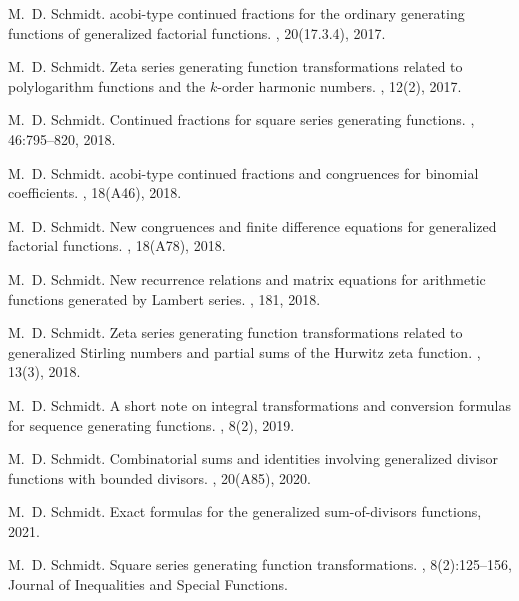 \documentclass[12pt,reqno,a4letter]{article}
\numberwithin{figure}{section}
\numberwithin{table}{section}
\numberwithin{equation}{section}
\theoremstyle{plain}
\numberwithin{theorem}{section}
\theoremstyle{definition}
\begin{document}
\begin{thebibliography}{10}
M.~D. Schmidt.
acobi-type continued fractions for the ordinary generating
  functions of generalized factorial functions.
, 20(17.3.4), 2017.

M.~D. Schmidt.
\newblock Zeta series generating function transformations related to
  polylogarithm functions and the $k$-order harmonic numbers.
, 12(2), 2017.

M.~D. Schmidt.
\newblock Continued fractions for square series generating functions.
, 46:795--820, 2018.

M.~D. Schmidt.
acobi-type continued fractions and congruences for binomial
  coefficients.
, 18(A46), 2018.

M.~D. Schmidt.
\newblock New congruences and finite difference equations for generalized
  factorial functions.
, 18(A78), 2018.

M.~D. Schmidt.
\newblock New recurrence relations and matrix equations for arithmetic
  functions generated by {L}ambert series.
, 181, 2018.

M.~D. Schmidt.
\newblock Zeta series generating function transformations related to
  generalized {S}tirling numbers and partial sums of the {H}urwitz zeta
  function.
, 13(3), 2018.

M.~D. Schmidt.
\newblock A short note on integral transformations and conversion formulas for
  sequence generating functions.
, 8(2), 2019.

M.~D. Schmidt.
\newblock Combinatorial sums and identities involving generalized divisor
  functions with bounded divisors.
, 20(A85), 2020.

M.~D. Schmidt.
\newblock Exact formulas for the generalized sum-of-divisors functions, 2021.

M.~D. Schmidt.
\newblock Square series generating function transformations.
, 8(2):125--156, Journal of Inequalities and Special
  Functions.


\end{thebibliography}
\end{document}
